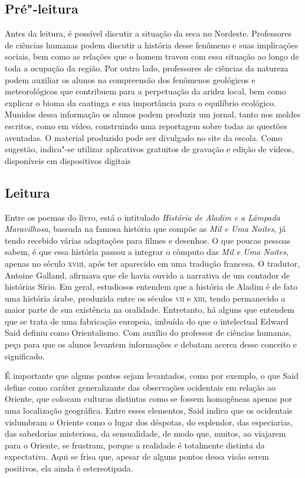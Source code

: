 \documentclass[12pt]{extarticle}
\begin{document}
\subsection{Pré"-leitura}

Antes da leitura, é possível discutir a situação da seca no
Nordeste. Professores de ciências humanas podem discutir a história
desse fenômeno e suas implicações sociais, bem como as relações que o
homem travou com essa situação ao longo de toda a ocupação da região.
Por outro lado, professores de ciências da natureza podem auxiliar os
alunos na compreensão dos fenômenos geológicos e meteorológicos que
contribuem para a perpetuação da aridez local, bem como explicar o bioma
da caatinga e sua importância para o equilíbrio ecológico. Munidos dessa
informação os alunos podem produzir um jornal, tanto nos moldes
escritos, como em vídeo, construindo uma reportagem sobre todas as
questões aventadas. O material produzido pode ser divulgado no site da
escola. Como sugestão, indica"-se utilizar aplicativos gratuitos de
gravação e edição de vídeos, disponíveis em dispositivos digitais

\subsection{Leitura}

Entre os poemas do livro, está o intitulado \emph{História
de Aladim e a Lâmpada Maravilhosa}, baseada na famosa história que
compõe as \emph{Mil e Uma Noites}, já tendo recebido várias adaptações
para filmes e desenhos. O que poucas pessoas sabem, é que essa história
passou a integrar o cômputo das \emph{Mil e Uma Noites}, apenas no
século \textsc{xviii}, após ter aparecido em uma tradução francesa. O tradutor,
Antoine Galland, afirmava que ele havia ouvido a narrativa de um
contador de histórias Sírio. Em geral, estudiosos entendem que a
história de Aladim é de fato uma história árabe, produzida entre os
séculos \textsc{vii} e \textsc{xiii}, tendo permanecido a maior parte de sua existência na
oralidade. Entretanto, há alguns que entendem que se trata de uma
fabricação europeia, imbuída do que o intelectual Edward Said definiu
como Orientalismo. Com auxílio do professor de ciências humanas, peça
para que os alunos levantem informações e debatam acerca desse conceito
e significado.

É importante que alguns pontos sejam levantados, como por exemplo, o que
Said define como caráter generalizante das observações ocidentais em
relação ao Oriente, que colocam culturas distintas como se fossem
homogêneas apenas por uma localização geográfica. Entre esses elementos,
Said indica que os ocidentais vislumbram o Oriente como o lugar dos
déspotas, do esplendor, das especiarias, das sabedorias misteriosa, da
sensualidade, de modo que, muitos, ao viajarem para o Oriente, se
frustram, porque a realidade é totalmente distinta da expectativa. Aqui
se frisa que, apesar de alguns pontos dessa visão serem positivos, ela
ainda é estereotipada.
\end{document}

